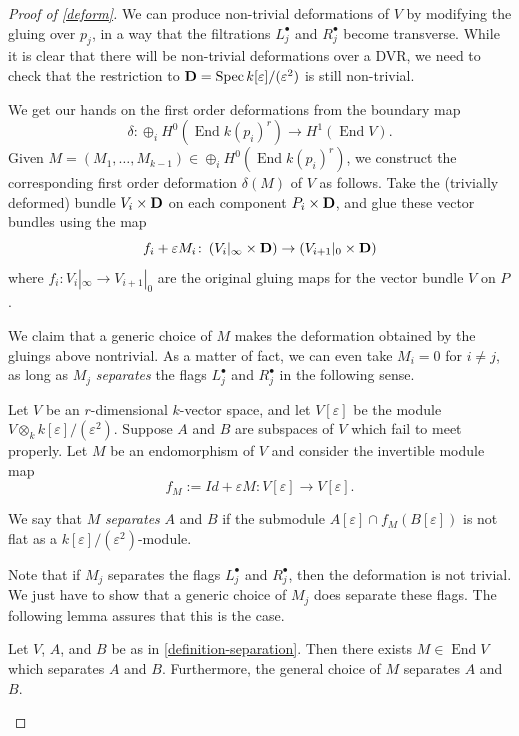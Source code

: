 \documentclass[11pt, two side, letterpaper, final]{amsart}
\newcommand {\D}{{\bf D}}
\newcommand {\from}{\colon}
\DeclareMathOperator{\spec}{Spec}
\DeclareMathOperator{\End}{End}
\renewcommand{\epsilon}{\varepsilon}
\begin{document}
\begin{proof}[Proof of \cref{deform}]
We can produce non-trivial deformations of $V$ by modifying the gluing over $p_j$, in a way that the filtrations
$L^{\bullet}_{j}$ and $R^{\bullet}_{j}$ become transverse. While it is clear that there will be non-trivial deformations over a DVR, we need to check that the restriction to $\D=\spec k[\epsilon]/(\epsilon^2)$ is still
non-trivial. 

We get our hands on the first order deformations from 
the boundary map $$\delta \from \oplus_{i}  H^{0}(\End k(p_{i})^{ r}) \to H^1(\End V).$$
Given $M = (M_{1},  \ldots , M_{k-1}) \in  \oplus _{i} H^{0}(\End k(p_{i})^{ r})$, we construct the corresponding first order deformation $\delta(M)$ of $V$ as follows. Take
the (trivially deformed) bundle $V_i \times \D$ on each component $P_i \times \D$, and glue these vector bundles using the map
\[
	f_i+\epsilon M_i \from \left(V_i|_{\infty} \times \D \right) \to \left(V_{i+1}|_0 \times \D \right) 
\]
where $f_i\from V_i|_\infty \to V_{i+1}|_0$ are the original gluing maps for the vector bundle $V$ on $P$.

We claim that a generic choice of $M$ makes the deformation obtained by the gluings above nontrivial. As a matter of fact, we can even take 
$M_i=0$ for $i\neq j$, as long as $M_j$ \emph{separates} the flags $L^{\bullet}_{j}$ and $R^{\bullet}_{j}$ in
the following sense.

\begin{definition}
\label{definition-separation}
Let $V$ be an $r$-dimensional $k$-vector space, and let $V[\epsilon]$ be the module $V \otimes_{k} k[\epsilon]/(\epsilon^2)$.  Suppose $A$ and $B$ are subspaces of $V$ which fail to meet properly. Let $M$ be an endomorphism of $V$ and consider the invertible module map \[f_{M} := Id + \epsilon M \from V[\epsilon] \to V[\epsilon].\] 

We say that $M$ \emph{separates} $A$ and  $B$ if the submodule $A[\epsilon] \cap f_{M}(B[\epsilon])$ is not flat as a $k[\epsilon]/(\epsilon^2)$-module.
\end{definition}

Note that if $M_j$ separates  the flags $L^{\bullet}_{j}$ and $R^{\bullet}_{j}$, then the deformation is not trivial.
We just have to show that a generic choice of $M_j$ does separate these flags. The following lemma assures that this is the case.

\begin{lemma}
\label{lemma-separate}
Let $V$, $A$, and $B$ be as in \cref{definition-separation}. Then there exists $M \in \End V$ which separates $A$ and $B$.  Furthermore, the general choice of $M$ separates $A$ and $B$.
\end{lemma}



\end{proof}
\end{document}
